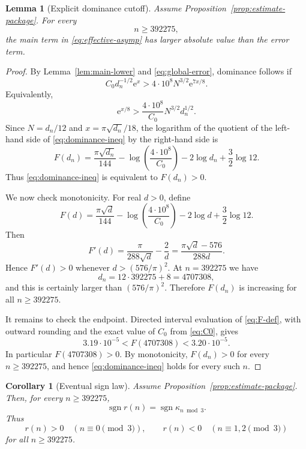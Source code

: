 \documentclass[10pt,a4paper]{amsart}
\newtheorem{lemma}[theorem]{Lemma}
\newtheorem{corollary}[theorem]{Corollary}
\newcommand{\e}{\mathrm e}
\begin{document}
\begin{lemma}[Explicit dominance cutoff]\label{lem:cutoff}
Assume Proposition~\ref{prop:estimate-package}.  For every
\[
n\geq392275,
\]
the main term in \eqref{eq:effective-asymp} has larger absolute value than
the error term.
\end{lemma}

\begin{proof}
By Lemma~\ref{lem:main-lower} and \eqref{eq:global-error}, dominance follows if
\[
C_0d_n^{-1/2}\e^x
>
4\cdot10^8N^{3/2}\e^{7x/8}.
\]
Equivalently,
\begin{equation}\label{eq:dominance-ineq}
\e^{x/8}>
\frac{4\cdot10^8}{C_0}N^{3/2}d_n^{1/2}.
\end{equation}
Since $N=d_n/12$ and $x=\pi\sqrt{d_n}/18$, the logarithm of the quotient of
the left-hand side of \eqref{eq:dominance-ineq} by the right-hand side is
\begin{equation}\label{eq:F-def}
F(d_n)
=
\frac{\pi\sqrt{d_n}}{144}
-
\log\left(\frac{4\cdot10^8}{C_0}\right)
-2\log d_n
+\frac32\log 12.
\end{equation}
Thus \eqref{eq:dominance-ineq} is equivalent to $F(d_n)>0$.

We now check monotonicity.  For real $d>0$, define
\[
F(d)=
\frac{\pi\sqrt d}{144}
-
\log\left(\frac{4\cdot10^8}{C_0}\right)
-2\log d
+\frac32\log 12.
\]
Then
\[
F'(d)=\frac{\pi}{288\sqrt d}-\frac2d
=\frac{\pi\sqrt d-576}{288d}.
\]
Hence $F'(d)>0$ whenever $d>(576/\pi)^2$.  At $n=392275$ we have
\[
d_n=12\cdot392275+8=4707308,
\]
and this is certainly larger than $(576/\pi)^2$.  Therefore $F(d_n)$ is
increasing for all $n\geq392275$.

It remains to check the endpoint.  Directed interval evaluation of
\eqref{eq:F-def}, with outward rounding and the exact value of $C_0$ from
\eqref{eq:C0}, gives
\[
3.19\cdot10^{-5}
<
F(4707308)
<
3.20\cdot10^{-5}.
\]
In particular $F(4707308)>0$.  By monotonicity, $F(d_n)>0$ for every
$n\geq392275$, and hence \eqref{eq:dominance-ineq} holds for every such $n$.
\end{proof}

\begin{corollary}[Eventual sign law]\label{cor:eventual-sign}
Assume Proposition~\ref{prop:estimate-package}.  Then, for every
$n\geq392275$,
\[
\operatorname{sgn}r(n)=\operatorname{sgn}\kappa_{n\bmod3}.
\]
Thus
\[
r(n)>0\quad(n\equiv0\pmod3),
\qquad
r(n)<0\quad(n\equiv1,2\pmod3)
\]
for all $n\geq392275$.
\end{corollary}
\end{document}
